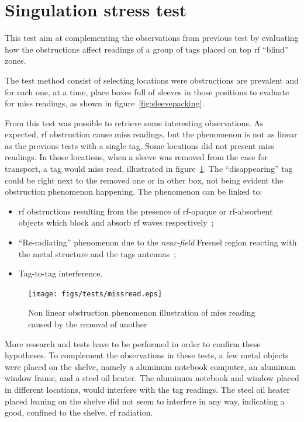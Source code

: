 \section{Singulation stress test}

This test aim at complementing the observations from previous test by evaluating how the obstructions affect readings of a group of tags placed on top \ac{rf} ``blind'' zones.

The test method consist of selecting locations were obstructions are prevalent and for each one, at a time, place boxes full of sleeves in those positions to evaluate for miss readings, as shown in figure~\ref{fig:sleevepacking}.

From this test was possible to retrieve some interesting observations. 
As expected, \ac{rf} obstruction cause miss readings, but the phenomenon is not as linear as the previous tests with a single tag. 
Some locations did not present miss readings. In those locations, when a sleeve was removed from the case for transport, a tag would miss read, illustrated in figure~\ref{fig:missreading}. The ``disappearing'' tag could be right next to the removed one or in other box, not being evident the obstruction phenomenon happening.
The phenomenon can be linked to:

\begin{itemize}
    \item \ac{rf} obstructions resulting from the presence of \ac{rf}-opaque or \ac{rf}-absorbent objects which block and absorb \ac{rf} waves respectively~\cite{lahiriRFIDSourcebook2005};
    \item ``Re-radiating'' phenomenon due to the \emph{near-field} Fresnel region reacting with the metal structure and the tags antennas~\cite{ElectromagneticRadiationField};
    \item Tag-to-tag interference.
\end{itemize}

\begin{figure}
    \centering
    \texttt{[image: figs/tests/missread.eps]}
    \caption{Non linear obstruction phenomenon illustration of miss reading caused by the removal of another}
    \label{fig:missreading}
\end{figure}

More research and tests have to be performed in order to confirm these hypotheses.
To complement the observations in these tests, a few metal objects were placed on the shelve, namely a aluminum notebook computer, an aluminum window frame, and a steel oil heater.
The aluminum notebook and window placed in different locations, would interfere with the tag readings. The steel oil heater placed leaning on the shelve did not seem to interfere in any way, indicating a good, confined to the shelve, \ac{rf} radiation.

